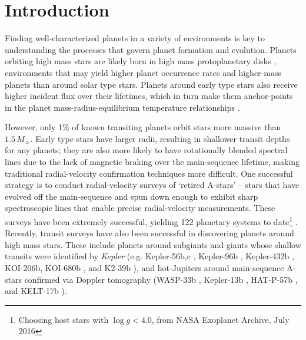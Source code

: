\documentclass[apjl]{emulateapj}
\newcommand{\logg}{\ensuremath{\log{g}}}
\newcommand{\msun}{\ensuremath{M_\sun}}
\begin{document}


\section{Introduction}
\label{sec:introduction}
\begin{comment}

\end{comment}

Finding well-characterized planets in a variety of environments is key to understanding the processes that govern planet formation and evolution. Planets orbiting high mass stars are likely born in high mass protoplanetary disks \citep[e.g.][]{Muzerolle:2003,Natta:2006}, environments that may yield higher planet occurrence rates \citep[e.g.][]{Johnson:2010,2010ApJ...709..396B} and higher-mass planets \citep[e.g.][]{2007A&A...472..657L,Jones:2014} than around solar type stars. Planets around early type stars also receive higher incident flux over their lifetimes, which in turn make them anchor-points in the planet mass-radius-equilibrium temperature relationships \citep[e.g.][]{2011ApJ...734..109B,2012A&A...540A..99E}. 

However, only 1\% of known transiting planets orbit stars more massive than $1.5\,\msun$. Early type stars have larger radii, resulting in shallower transit depths for any planets; they are also more likely to have rotationally blended spectral lines due to the lack of magnetic braking over the main-sequence lifetime, making traditional radial-velocity confirmation techniques more difficult. One successful strategy is to conduct radial-velocity surveys of `retired A-stars' -- stars that have evolved off the main-sequence and spun down enough to exhibit sharp spectroscopic lines that enable precise radial-velocity measurements. These surveys have been extremely successful, yielding 122 planetary systems to date\footnote{Choosing host stars with $\logg < 4.0$, from NASA Exoplanet Archive, July 2016} \citep[e.g.][]{Johnson:2007,Wittenmyer:2011,Jones:2014}. Recently, transit surveys have also been successful in discovering planets around high mass stars. These include planets around subgiants and giants whose shallow transits were identified by \emph{Kepler} (e.g. Kepler-56b,c \citealt{2013Sci...342..331H}, Kepler-96b \citealt{2014A&A...562A.109L}, Kepler-432b \citealt{2015ApJ...803...49Q,2015A&A...573L...5C}, KOI-206b, KOI-680b \citealt{2015A&A...575A..71A}, and K2-39b \citealt{2016arXiv160509180V}), and hot-Jupiters around main-sequence A-stars confirmed via Doppler tomography (WASP-33b \citealt{Collier:2010b}, Kepler-13b \citealt{Szabo:2011,Shporer:2011,Johnson:2014}, HAT-P-57b \citealt{Hartman:2015}, and KELT-17b \citealt{2016arXiv160703512Z}). 
\end{document}
